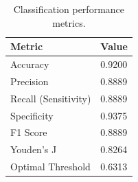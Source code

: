 \begin{table}
\caption{Classification performance metrics.}
\label{tab:metrics}
\begin{tabular}{ll}
\toprule
Metric & Value \\
\midrule
Accuracy & 0.9200 \\
Precision & 0.8889 \\
Recall (Sensitivity) & 0.8889 \\
Specificity & 0.9375 \\
F1 Score & 0.8889 \\
Youden’s J & 0.8264 \\
Optimal Threshold & 0.6313 \\
\bottomrule
\end{tabular}
\end{table}
